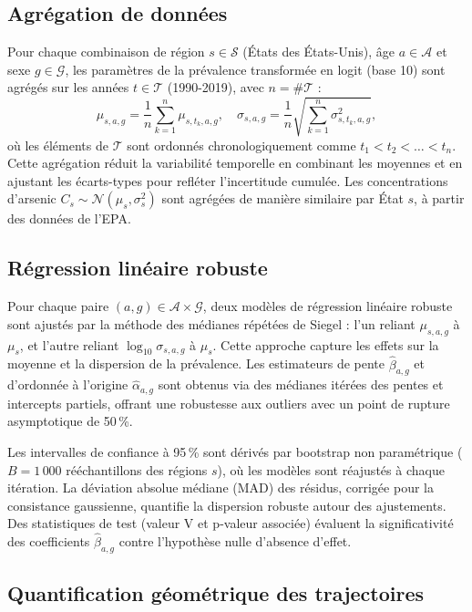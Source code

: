 \subsection{Agrégation de données}

Pour chaque combinaison de région $s \in \mathcal{S}$ (États des États-Unis), âge $a \in \mathcal{A}$ et sexe $g \in \mathcal{G}$, les paramètres de la prévalence transformée en logit (base 10) sont agrégés sur les années $t \in \mathcal{T}$ (1990-2019), avec $n = \#\mathcal{T}$ :
\[
\mu_{s,a,g} = \frac{1}{n} \sum_{k=1}^n \mu_{s,t_k,a,g}, \quad \sigma_{s,a,g} = \frac{1}{n} \sqrt{\sum_{k=1}^n \sigma_{s,t_k,a,g}^2},
\]
où les éléments de $\mathcal{T}$ sont ordonnés chronologiquement comme $t_1 < t_2 < \dots < t_n$. Cette agrégation réduit la variabilité temporelle en combinant les moyennes et en ajustant les écarts-types pour refléter l'incertitude cumulée. Les concentrations d'arsenic $C_s \sim \mathcal{N}(\mu_s, \sigma_s^2)$ sont agrégées de manière similaire par État $s$, à partir des données de l'EPA.

\subsection{Régression linéaire robuste}

Pour chaque paire $(a, g) \in \mathcal{A} \times \mathcal{G}$, deux modèles de régression linéaire robuste sont ajustés par la méthode des médianes répétées de Siegel : l'un reliant $\mu_{s,a,g}$ à $\mu_s$, et l'autre reliant $\log_{10} \sigma_{s,a,g}$ à $\mu_s$. Cette approche capture les effets sur la moyenne et la dispersion de la prévalence. Les estimateurs de pente $\hat{\beta}_{a,g}$ et d'ordonnée à l'origine $\hat{\alpha}_{a,g}$ sont obtenus via des médianes itérées des pentes et intercepts partiels, offrant une robustesse aux outliers avec un point de rupture asymptotique de 50\,\%. 

Les intervalles de confiance à 95\,\% sont dérivés par bootstrap non paramétrique ($B = 1\,000$ rééchantillons des régions $s$), où les modèles sont réajustés à chaque itération. La déviation absolue médiane (MAD) des résidus, corrigée pour la consistance gaussienne, quantifie la dispersion robuste autour des ajustements. Des statistiques de test (valeur V et p-valeur associée) évaluent la significativité des coefficients $\hat{\beta}_{a,g}$ contre l'hypothèse nulle d'absence d'effet.

\subsection{Quantification géométrique des trajectoires}

